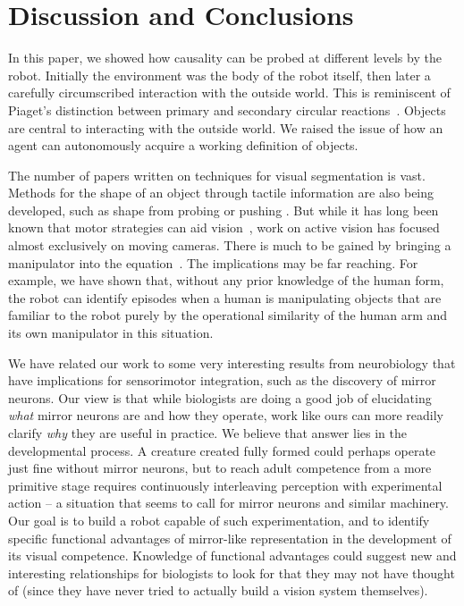 
\section{Discussion and Conclusions}

In this paper, we showed how causality can be probed at different
levels by the robot.  Initially the environment was the body of the
robot itself, then later a carefully circumscribed interaction with
the outside world.  This is reminiscent of Piaget's distinction
between primary and secondary circular
reactions~\cite{ginsburg78piaget}.  Objects are central to interacting
with the outside world.  We raised the issue of how an agent can
autonomously acquire a working definition of objects. 

The number of papers written on techniques for visual segmentation is
vast.  Methods for \ahhcharacterizing{} the shape of an object through
tactile information are also being developed, such as shape from
probing 
\cite{paulos99fast} 
or pushing
\cite{moll01reconstructing}.  
But while it has long
been known that motor strategies can aid
vision~\cite{ballard91animate}, work on active vision has focused
almost exclusively on moving cameras.  There is much to be gained by
bringing a manipulator into the equation~\cite{tsikos91segmentation}.
The implications may be far reaching.  For example,
we have shown that, without any prior knowledge of the human form, 
the robot can identify episodes when a human is manipulating objects
that are familiar to the robot purely by the operational similarity 
of the human arm and its own manipulator in this situation.

We have related our work to some very interesting results from
neurobiology that have implications for sensorimotor integration, such
as the discovery of mirror neurons.  Our view is that while biologists
are doing a good job of elucidating {\em what} mirror neurons are and
how they operate, work like ours can more readily clarify {\em why}
they are useful in practice.  We believe that answer lies in the
developmental process.  A creature created fully formed could perhaps
operate just fine without mirror neurons, but to reach adult
competence from a more primitive stage requires continuously
interleaving perception with experimental action -- a situation that
seems to call for mirror neurons and similar machinery.  Our goal is
to build a robot capable of such experimentation, and to identify
specific functional advantages of mirror-like representation in the
development of its visual competence.  Knowledge of functional
advantages could suggest new and interesting relationships for biologists to
look for that they may not have thought of (since they have never
tried to actually build a vision system themselves).


